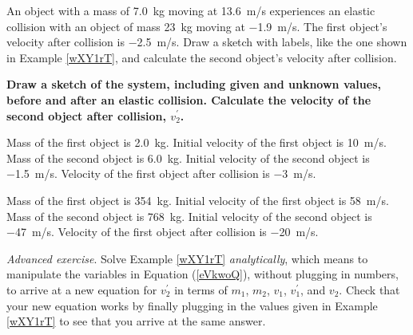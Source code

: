 \documentclass[main.tex]{subfiles}
\begin{document}
\begin{exercise}\label{bTj1d8} %
An object with a mass of \SI{7.0}{kg} moving at \SI{13.6}{m/s} experiences an elastic collision with an object of mass \SI{23}{kg} moving at \SI{-1.9}{m/s}. The first object's velocity after collision is \SI{-2.5}{m/s}. Draw a sketch with labels, like the one shown in Example \ref{wXY1rT}, and calculate the second object's velocity after collision.
\end{exercise}

\cyanhrule

\vspace{1em}

\textbf{Draw a sketch of the system, including given and unknown values, before and after an elastic collision. Calculate the velocity of the second object after collision, $v_2^{\prime}$.}

\begin{exercise} \label{O4Og7L} %
    Mass of the first object is \SI{2.0}{kg}.
    Initial velocity of the first object is \SI{10}{m/s}. 
    Mass of the second object is \SI{6.0}{kg}. 
    Initial velocity of the second object is \SI{-1.5}{m/s}. 
    Velocity of the first object after collision is \SI{-3}{m/s}.
\end{exercise}

\begin{exercise} \label{6yR4Xo} %
    Mass of the first object is \SI{354}{kg}.
    Initial velocity of the first object is \SI{58}{m/s}. 
    Mass of the second object is \SI{768}{kg}. 
    Initial velocity of the second object is \SI{-47}{m/s}. 
    Velocity of the first object after collision is \SI{-20}{m/s}.
\end{exercise}

\cyanhrule

\begin{exercise} \label{jhvCZ1}
\textit{Advanced exercise}. Solve Example \ref{wXY1rT} \textit{analytically}, which means to manipulate the variables in Equation (\ref{eVkwoQ}), without plugging in numbers, to arrive at a new equation for $v_2^{\prime}$ in terms of $m_1$, $m_2$, $v_1$, $v_1^{\prime}$, and $v_2$. Check that your new equation works by finally plugging in the values given in Example \ref{wXY1rT} to see that you arrive at the same answer.
\end{exercise}
\end{document}
